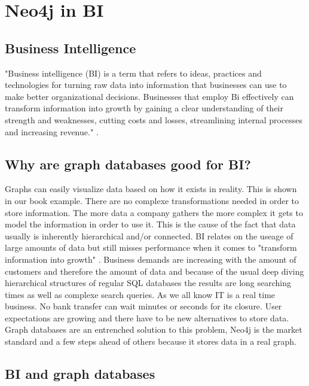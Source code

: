 
\section{Neo4j in BI}

\subsection{Business Intelligence}

"Business intelligence (BI) is a term that refers to ideas, practices and technologies for turning raw data into information that businesses can use to make better organizational decisions. Businesses that employ Bi effectively can transform information into growth by gaining a clear understanding of their strength and weaknesses, cutting costs and losses, streamlining internal processes and increasing revenue." \cite{neo4jBIDef:2014}. \nocite{BiSlides:2013}

\subsection{Why are graph databases good for BI?}

Graphs can easily visualize data based on how it exists in reality. This is shown in our book example. There are no complexe transformations needed in order to store information.
The more data a company gathers the more complex it gets to model the information in order to use it. This is the cause of the fact that data usually is inherently hierarchical and/or connected. BI relates on the useage of large amounts of data but still misses performance when it comes to "transform information into growth" \cite{neo4jBIDef:2014}. Business demands are increasing with the amount of customers and therefore the amount of data and because of the usual deep diving hierarchical structures of regular SQL databases the results are long searching times as well as complexe search queries. As we all know IT is a real time business. No bank transfer can wait minutes or seconds for its closure. User expectations are growing and there have to be new alternatives to store data. Graph databases are an entrenched solution to this problem, Neo4j is the market standard and a few steps ahead of others because it stores data in a real graph.

\subsection{BI and graph databases}


